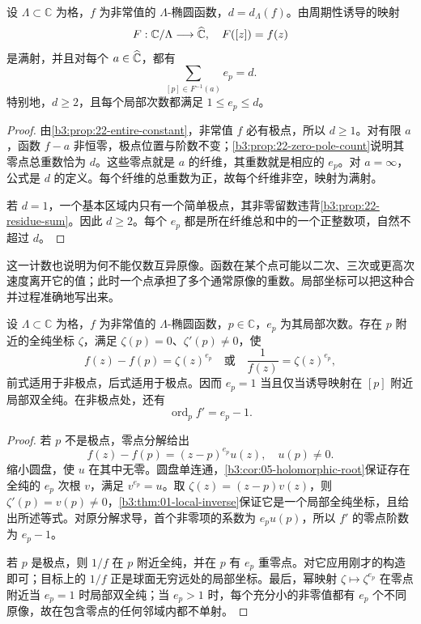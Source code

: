 \begin{proposition}\label{b3:prop:22-fiber-degree}
设 \(\Lambda\subset\mathbb C\) 为格，\(f\) 为非常值的 \(\Lambda\)-椭圆函数，\(d=d_\Lambda(f)\)。由周期性诱导的映射
\[
 F:\mathbb C/\Lambda\longrightarrow\widehat{\mathbb C\kern0pt},
 \quad F([z])=f(z)
\]
是满射，并且对每个 \(a\in\widehat{\mathbb C\kern0pt}\)，都有
\[
 \sum_{[p]\in F^{-1}(a)}e_p=d.
\]
特别地，\(d\ge2\)，且每个局部次数都满足 \(1\le e_p\le d\)。
\end{proposition}
\begin{proof}
由\cref{b3:prop:22-entire-constant}，非常值 \(f\) 必有极点，所以 \(d\ge1\)。对有限 \(a\)，函数 \(f-a\) 非恒零，极点位置与阶数不变；\cref{b3:prop:22-zero-pole-count}说明其零点总重数恰为 \(d\)。这些零点就是 \(a\) 的纤维，其重数就是相应的 \(e_p\)。对 \(a=\infty\)，公式是 \(d\) 的定义。每个纤维的总重数为正，故每个纤维非空，映射为满射。

若 \(d=1\)，一个基本区域内只有一个简单极点，其非零留数违背\cref{b3:prop:22-residue-sum}。因此 \(d\ge2\)。每个 \(e_p\) 都是所在纤维总和中的一个正整数项，自然不超过 \(d\)。
\end{proof}

这一计数也说明为何不能仅数互异原像。函数在某个点可能以二次、三次或更高次速度离开它的值；此时一个点承担了多个通常原像的重数。局部坐标可以把这种合并过程准确地写出来。

\begin{proposition}\label{b3:prop:22-local-ramification}
设 \(\Lambda\subset\mathbb C\) 为格，\(f\) 为非常值的 \(\Lambda\)-椭圆函数，\(p\in\mathbb C\)，\(e_p\) 为其局部次数。存在 \(p\) 附近的全纯坐标 \(\zeta\)，满足 \(\zeta(p)=0\)、\(\zeta'(p)\ne0\)，使
\[
 f(z)-f(p)=\zeta(z)^{e_p}
 \quad\text{或}\quad
 \frac1{f(z)}=\zeta(z)^{e_p},
\]
前式适用于非极点，后式适用于极点。因而 \(e_p=1\) 当且仅当诱导映射在 \([p]\) 附近局部双全纯。在非极点处，还有
\[
 \operatorname{ord}_p f'=e_p-1.
\]
\end{proposition}
\begin{proof}
若 \(p\) 不是极点，零点分解给出
\[
 f(z)-f(p)=(z-p)^{e_p}u(z),\quad u(p)\ne0.
\]
缩小圆盘，使 \(u\) 在其中无零。圆盘单连通，\cref{b3:cor:05-holomorphic-root}保证存在全纯的 \(e_p\) 次根 \(v\)，满足 \(v^{e_p}=u\)。取 \(\zeta(z)=(z-p)v(z)\)，则 \(\zeta'(p)=v(p)\ne0\)，\cref{b3:thm:01-local-inverse}保证它是一个局部全纯坐标，且给出所述等式。对原分解求导，首个非零项的系数为 \(e_pu(p)\)，所以 \(f'\) 的零点阶数为 \(e_p-1\)。

若 \(p\) 是极点，则 \(1/f\) 在 \(p\) 附近全纯，并在 \(p\) 有 \(e_p\) 重零点。对它应用刚才的构造即可；目标上的 \(1/f\) 正是球面无穷远处的局部坐标。最后，幂映射 \(\zeta\mapsto\zeta^{e_p}\) 在零点附近当 \(e_p=1\) 时局部双全纯；当 \(e_p>1\) 时，每个充分小的非零值都有 \(e_p\) 个不同原像，故在包含零点的任何邻域内都不单射。
\end{proof}

